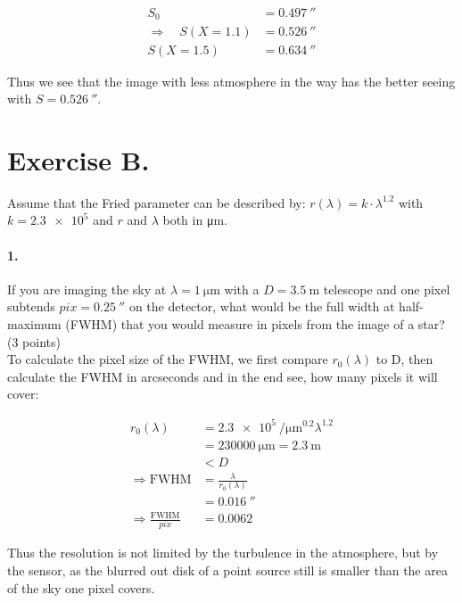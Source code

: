 \documentclass[11pt,a4paper,twoside]{article}
\begin{document}
\begin{align}
S_0 &= \SI{0.497}{\arcsecond} \\
\Rightarrow\quad S(X=1.1) &= \SI{0.526}{\arcsecond} \\
S(X=1.5) &= \SI{0.634}{\arcsecond}
\end{align}

Thus we see that the image with less atmosphere in the way has the better
seeing with $S = \SI{0.526}{\arcsecond}$. 


\section*{Exercise B.}
Assume that the Fried parameter can be described by:
$r(\lambda) = k \cdot \lambda^{1.2}$ with $k = \num{2.3e5}$ and $r$ and
$\lambda$ both in \si{\micro\meter}.

\paragraph{1.} If you are imaging the sky at $\lambda = \SI{1}{\micro\meter}$
with a $D = \SI{3.5}{\meter}$ telescope and one pixel subtends
$pix = \SI{0.25}{\arcsecond}$ on the detector, what would be the full width at
half-maximum (FWHM) that you would measure in pixels from the image of a star?
(3 points)\\

To calculate the pixel size of the FWHM, we first compare $r_0(\lambda)$ to D,
then calculate the FWHM in arcseconds and in the end see, how many pixels it
will cover:

\begin{align}
r_0(\lambda)    &= \SI{2.3e5}{\per\micro\meter\tothe{0.2}}\lambda^{1.2}  \\
                &= \SI{230000}{\micro\meter} = \SI{2.3}{\meter}         \\
                &< D                                                    \\
\Rightarrow 
\mathrm{FWHM}   &= \frac{\lambda}{r_0(\lambda)}                         \\
                &= \SI{0.016}{\arcsecond}                               \\
\Rightarrow
\frac{\mathrm{FWHM}}{pix} &= 0.0062
\end{align}

Thus the resolution is not limited by the turbulence in the atmosphere, but
by the sensor, as the blurred out disk of a point source still is smaller than
the area of the sky one pixel covers.
\end{document}
